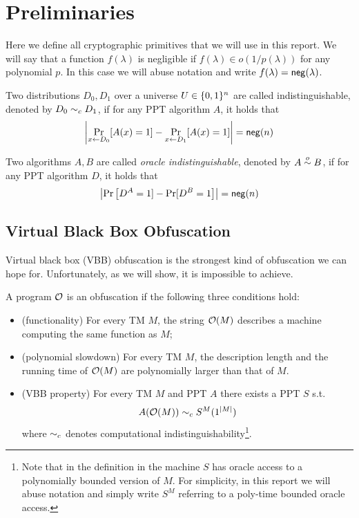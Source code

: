 \section{Preliminaries}

Here we define all cryptographic primitives that we will use in this report. We will say that a function $f(\lambda)$ is negligible if $f(\lambda)\in o(1/p(\lambda))$ for any polynomial $p$. In this case we will abuse notation and write $f(\lambda)=\mathsf{neg}(\lambda)$.

Two distributions $D_0,D_1$ over a universe $U\in\{0,1\}^n$ are called indistinguishable, denoted by $D_0\sim_c D_1$, if for any PPT algorithm $A$, it holds that
\[
\left|\Pr_{x\gets D_0}[A(x)=1]-\Pr_{x\gets D_1}[A(x)=1]\right|=\mathsf{neg}(n)
\]

Two algorithms $A,B$ are called \emph{oracle indistinguishable}, denoted by $A\overset{o}{\sim} B$, if for any PPT algorithm $D$, it holds that
\[
\left|\Pr\left[D^A=1]-\Pr[D^B=1\right]\right|=\mathsf{neg}(n)
\]

\subsection{Virtual Black Box Obfuscation}
\label{subsec:VBB}
Virtual black box (VBB) obfuscation is the strongest kind of obfuscation we can hope for. Unfortunately, as we will show, it is impossible to achieve.

\begin{mydef}[TM-obfuscator]
	\label{def:VBB-tm}
	A program $\mathcal{O}$ is an obfuscation if the following three conditions hold: %
	\begin{itemize}
		\item (functionality) For every TM $M$, the string $\mathcal{O}(M)$ describes a machine computing the same function as $M$;
		\item (polynomial slowdown)  For every TM $M$, the description length and the running time of $\mathcal{O}(M)$ are polynomially larger than that of $M$.
		\item (VBB property) For every TM $M$ and PPT $A$ there exists a PPT $S$ s.t. 
		$$ A(\mathcal{O}(M)) \sim_c S^M(1^{|M|}) $$
		where $\sim_c$ denotes computational indistinguishability\footnote{Note that in the definition in \cite{VBB-imp} the machine $S$ has oracle access to a polynomially bounded version of $M$. For simplicity, in this report we will abuse notation and simply write $S^M$ referring to a poly-time bounded oracle access. }.
	\end{itemize}
\end{mydef}

